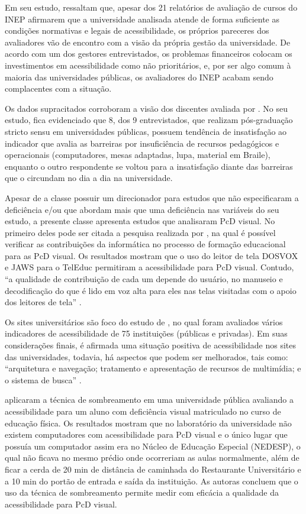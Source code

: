 \documentclass{textolivre}
\begin{document}
Em seu estudo, \textcite{cantoranipilatti2015} ressaltam que, apesar dos 21 relatórios de avaliação de cursos do INEP afirmarem que a universidade analisada atende de forma suficiente as condições normativas e legais de acessibilidade, os próprios pareceres dos avaliadores vão de encontro com a visão da própria gestão da universidade. De acordo com um dos gestores entrevistados, os problemas financeiros colocam os investimentos em acessibilidade como não prioritários, e, por ser algo comum à maioria das universidades públicas, os avaliadores do INEP acabam sendo complacentes com a situação.

Os dados supracitados corroboram a visão dos discentes avaliada por \textcite{branco2019}. No seu estudo, fica evidenciado que 8, dos 9 entrevistados, que realizam pós-graduação stricto sensu em universidades públicas, possuem tendência de insatisfação ao indicador que avalia as barreiras por insuficiência de recursos pedagógicos e operacionais (computadores, mesas adaptadas, lupa, material em Braile), enquanto o outro respondente se voltou para a insatisfação diante das barreiras que o circundam no dia a dia na universidade.

Apesar de a classe possuir um direcionador para estudos que não especificaram a deficiência e/ou que abordam mais que uma deficiência nas variáveis do seu estudo, a presente classe apresenta estudos que analisaram PcD visual. No primeiro deles pode ser citada a pesquisa realizada por \textcite{wataya2006}, na qual é possível verificar as contribuições da informática no processo de formação educacional para as PcD visual. Os resultados mostram que o uso do leitor de tela DOSVOX e JAWS para o TelEduc permitiram a acessibilidade para PcD visual. Contudo, “a qualidade de contribuição de cada um depende do usuário, no manuseio e decodificação do que é lido em voz alta para eles nas telas visitadas com o apoio dos leitores de tela” \cite[p. 240]{wataya2006}.

Os sites universitários são foco do estudo de \textcite{ortega2013}, no qual foram avaliados vários indicadores de acessibilidade de 75 instituições (públicas e privadas). Em suas considerações finais, é afirmada uma situação positiva de acessibilidade nos sites das universidades, todavia, há aspectos que podem ser melhorados, tais como: “arquitetura e navegação; tratamento e apresentação de recursos de multimídia; e o sistema de busca” \cite[p. 90]{ortega2013}.

\textcite{silva+ferreira2017} aplicaram a técnica de sombreamento em uma universidade pública avaliando a acessibilidade para um aluno com deficiência visual matriculado no curso de educação física. Os resultados mostram que no laboratório da universidade não existem computadores com acessibilidade para PcD visual e o único lugar que possuía um computador assim era no Núcleo de Educação Especial (NEDESP), o qual não ficava no mesmo prédio onde ocorreriam as aulas normalmente, além de ficar a cerda de 20 min de distância de caminhada do Restaurante Universitário e a 10 min do portão de entrada e saída da instituição. As autoras concluem que o uso da técnica de sombreamento permite medir com eficácia a qualidade da acessibilidade para PcD visual.
\end{document}
